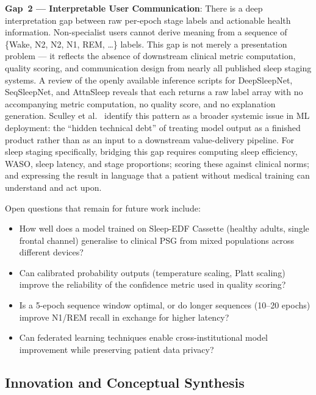 \documentclass[10pt]{article}
\begin{document}
\textbf{Gap~2 --- Interpretable User Communication}: There is a deep interpretation gap between raw per-epoch stage labels and actionable health information. Non-specialist users cannot derive meaning from a sequence of \{Wake, N2, N2, N1, REM, \ldots\} labels. This gap is not merely a presentation problem --- it reflects the absence of downstream clinical metric computation, quality scoring, and communication design from nearly all published sleep staging systems. A review of the openly available inference scripts for DeepSleepNet, SeqSleepNet, and AttnSleep reveals that each returns a raw label array with no accompanying metric computation, no quality score, and no explanation generation. Sculley et al.~\cite{sculley2015hidden} identify this pattern as a broader systemic issue in ML deployment: the ``hidden technical debt'' of treating model output as a finished product rather than as an input to a downstream value-delivery pipeline. For sleep staging specifically, bridging this gap requires computing sleep efficiency, WASO, sleep latency, and stage proportions; scoring these against clinical norms; and expressing the result in language that a patient without medical training can understand and act upon.

Open questions that remain for future work include:
\begin{itemize}
  \item How well does a model trained on Sleep-EDF Cassette (healthy adults, single frontal channel) generalise to clinical PSG from mixed populations across different devices?
  \item Can calibrated probability outputs (temperature scaling, Platt scaling) improve the reliability of the confidence metric used in quality scoring?
  \item Is a 5-epoch sequence window optimal, or do longer sequences (10--20 epochs) improve N1/REM recall in exchange for higher latency?
  \item Can federated learning techniques enable cross-institutional model improvement while preserving patient data privacy?
\end{itemize}

\subsection{Innovation and Conceptual Synthesis}
\label{sec:synthesis}
\end{document}
